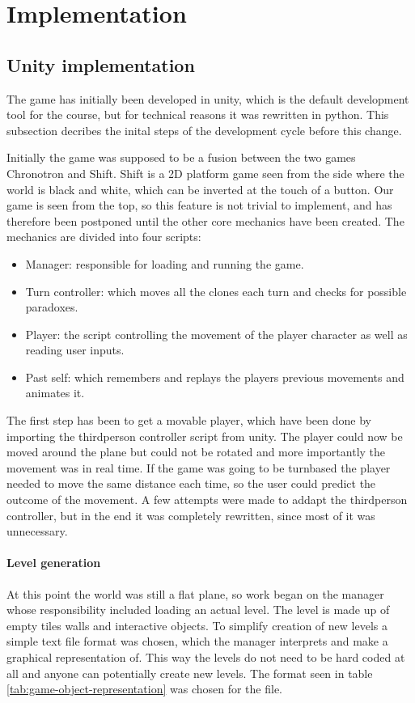 \section{Implementation}
\subsection{Unity implementation}
The game has initially been developed in unity, which is the default development
tool for the course, but for technical reasons it was rewritten in python. This
subsection decribes the inital steps of the development cycle before this change.

Initially the game was supposed to be a fusion between the two games
Chronotron and Shift. Shift is a 2D platform game seen from the side where
the world is black and white, which can be inverted at the touch of a button.
Our game is seen from the top, so this feature is not trivial to implement, and
has therefore been postponed until the other core mechanics have been created.
The mechanics are divided into four scripts:\\

\begin{itemize}
\item Manager: responsible for loading and running the game.
\item Turn controller: which moves all the clones each turn and checks for possible paradoxes.
\item Player: the script controlling the movement of the player character as well as reading user inputs.
\item Past self: which remembers and replays the players previous movements and animates it.
\end{itemize}

The first step has been to get a movable player, which have been done by importing the
thirdperson controller script from unity. The player could now be moved around
the plane but could not be rotated and more importantly the movement was in
real time. If the game was going to be turnbased the player needed to move
the same distance each time, so the user could predict the outcome of the
movement. A few attempts were made to addapt the thirdperson controller,
but in the end it was completely rewritten, since most of it was unnecessary.

\paragraph {Level generation} At this point the world was still a flat plane,
so work began on the manager whose responsibility included loading an actual
level. The level is made up of empty tiles walls and interactive objects. To
simplify creation of new levels a simple text file format was chosen, which the
manager interprets and make a graphical representation of. This way the
levels do not need to be hard coded at all and anyone can potentially create
new levels. The format seen in table \ref{tab:game-object-representation}
was chosen for the file.

